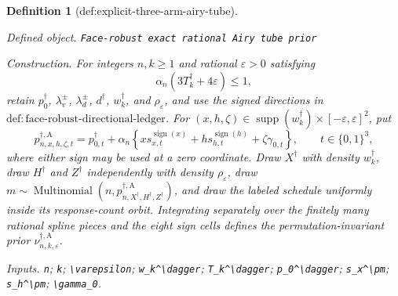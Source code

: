 \documentclass{article}
\newtheorem{definition}{Definition}
\begin{document}
\begin{definition}[def:explicit-three-arm-airy-tube]\label{def:explicit-three-arm-airy-tube}
\par\smallskip\noindent\emph{Defined object.} \texttt{Face-\allowbreak{}robust exact rational Airy tube prior}
\par\smallskip\noindent\emph{Construction.} For integers \(n,k\ge1\) and rational \(\varepsilon>0\) satisfying
\[
\alpha_n(3T_k^\dagger+4\varepsilon)\le1,
\]
retain \(p_0^\dagger\), \(\lambda_v^\pm\), \(\lambda_d^\pm\),
\(d^\dagger\), \(w_k^\dagger\), and \(\rho_\varepsilon\), and use the signed directions in
\(\mathrm{def:face\text{-}robust\text{-}directional\text{-}ledger}\).  For
\((x,h,\zeta)\in\operatorname{supp}(w_k^\dagger)\times
[-\varepsilon,\varepsilon]^2\), put
\[
p_{n,x,h,\zeta,t}^{\dagger,\mathrm A}
=p_{0,t}^\dagger+\alpha_n\left\{
x s_{x,t}^{\operatorname{sign}(x)}
+h s_{h,t}^{\operatorname{sign}(h)}
+\zeta\gamma_{0,t}\right\},
\qquad t\in\{0,1\}^3,
\]
where either sign may be used at a zero coordinate.  Draw \(X^\dagger\) with density
\(w_k^\dagger\), draw \(H^\dagger\) and \(Z^\dagger\) independently with density
\(\rho_\varepsilon\), draw
\(m\sim\operatorname{Multinomial}(n,p_{n,X^\dagger,H^\dagger,Z^\dagger}^{\dagger,\mathrm A})\), and draw the labeled schedule uniformly inside its response-count orbit.  Integrating separately over the finitely many rational spline pieces and the eight sign cells defines the permutation-invariant prior
\(\nu_{n,k,\varepsilon}^{\dagger,\mathrm A}\).
\par\smallskip\noindent\emph{Inputs.} \texttt{n}; \texttt{k}; \texttt{\textbackslash{}\allowbreak{}varepsilon}; \texttt{w\_\allowbreak{}k\textasciicircum{}\textbackslash{}\allowbreak{}dagger}; \texttt{T\_\allowbreak{}k\textasciicircum{}\textbackslash{}\allowbreak{}dagger}; \texttt{p\_\allowbreak{}0\textasciicircum{}\textbackslash{}\allowbreak{}dagger}; \texttt{s\_\allowbreak{}x\textasciicircum{}\textbackslash{}\allowbreak{}pm}; \texttt{s\_\allowbreak{}h\textasciicircum{}\textbackslash{}\allowbreak{}pm}; \texttt{\textbackslash{}\allowbreak{}gamma\_\allowbreak{}0}.
\end{definition}
\end{document}
